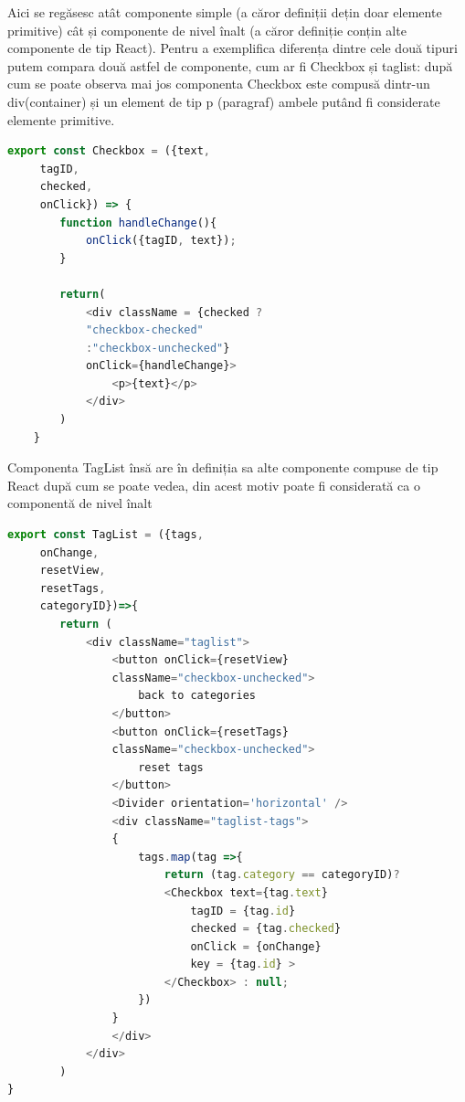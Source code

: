 \documentclass[12pt,a4paper,hidelinks]{report}
\theoremstyle{definition}
\theoremstyle{remark}
\begin{document}
\begin{itemize}
    Aici se regăsesc atât componente simple (a căror definiții dețin doar elemente primitive) cât și componente de nivel înalt 
    (a căror definiție conțin alte componente de tip React). 
    Pentru a exemplifica diferența dintre cele două tipuri putem compara două astfel de componente, cum ar fi Checkbox și taglist:
    după cum se poate observa mai jos componenta Checkbox este compusă dintr-un div(container) și un element de tip p (paragraf)
    ambele putând fi considerate elemente primitive.
    \begin{lstlisting}[language=Javascript]
    export const Checkbox = ({text,
     tagID,
     checked,
     onClick}) => {
        function handleChange(){
            onClick({tagID, text});
        }

        return(
            <div className = {checked ?
            "checkbox-checked"
            :"checkbox-unchecked"}
            onClick={handleChange}>
                <p>{text}</p>
            </div>
        )
    }
    \end{lstlisting}
    Componenta TagList însă are în definiția sa alte componente compuse de tip React după cum se poate vedea, 
    din acest motiv poate fi considerată ca o componentă de nivel înalt
    \begin{lstlisting}[language=Javascript]
    export const TagList = ({tags,
     onChange,
     resetView,
     resetTags,
     categoryID})=>{
        return (
            <div className="taglist">
                <button onClick={resetView}
                className="checkbox-unchecked">
                    back to categories
                </button>
                <button onClick={resetTags}
                className="checkbox-unchecked">
                    reset tags
                </button>
                <Divider orientation='horizontal' />
                <div className="taglist-tags">
                {
                    tags.map(tag =>{
                        return (tag.category == categoryID)?
                        <Checkbox text={tag.text}
                            tagID = {tag.id}
                            checked = {tag.checked}
                            onClick = {onChange}
                            key = {tag.id} >
                        </Checkbox> : null;
                    }) 
                }
                </div>
            </div>
        )
}
    \end{lstlisting}
\end{itemize}
\end{document}
